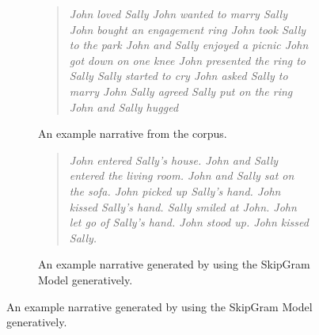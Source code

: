 \documentclass[11pt,letterpaper]{article}
\begin{document}
\begin{figure}[h!]
    \centering
    \begin{subfigure}[b]{0.5\textwidth}
    \blockquote{
        \textit{
        \small
        John loved Sally
        John wanted to marry Sally
        John bought an engagement ring
        John took Sally to the park
        John and Sally enjoyed a picnic
        John got down on one knee
        John presented the ring to Sally
        Sally started to cry
        John asked Sally to marry John
        Sally agreed
        Sally put on the ring
        John and Sally hugged
        }
    }



    
        \caption{An example narrative from the corpus.\vspace{0.2in}}%
        
        \label{figure:story_corpus}    
    \end{subfigure}
    
    \begin{subfigure}[b]{0.5\textwidth}
        \blockquote{
        \textit{
        \small
        John entered Sally's house.
        John and Sally entered the living room.
        John and Sally sat on the sofa.
        John picked up Sally's hand.
        John kissed Sally's hand.
        Sally smiled at John.
        John let go of Sally's hand.
        John stood up.
        John kissed Sally.
        }
        }
        \caption{An example narrative generated by using the SkipGram Model generatively.\vspace{0.2in}}
        \label{figure:story_generativemodel}
    \end{subfigure}    
    

\end{figure}
\end{document}
